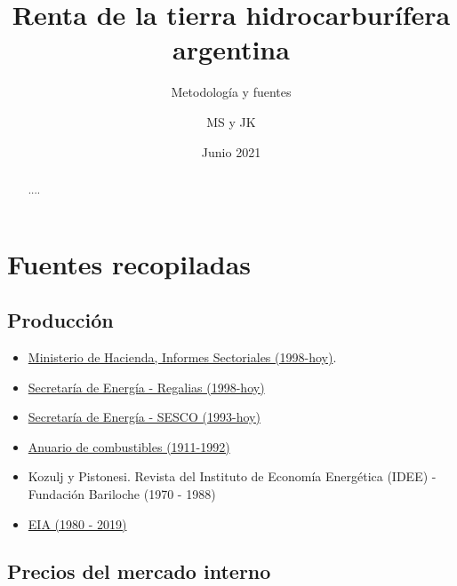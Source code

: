 \documentclass[letterpaper,11pt, spanish]{scrartcl}
\begin{document}
\title{Renta de la tierra hidrocarburífera argentina}
\subtitle{Metodología y fuentes}
\author{MS y JK}
\date{Junio 2021}
\maketitle

\begin{abstract}
....
\end{abstract}


\section{Fuentes recopiladas}
\subsection{Producción}

\begin{itemize}
    \item \hyperlink{https://www.argentina.gob.ar/economia/politicaeconomica/regionalysectorial/informesproductivos}{Ministerio de Hacienda, Informes Sectoriales (1998-hoy)}.
    \item \hyperlink{http://datos.minem.gob.ar/dataset/regalias-de-petroleo-crudo-gas-natural-glp-gasolina-y-condensado}{Secretaría de Energía - Regalias (1998-hoy)}
    \item \hyperlink{http://datos.minem.gob.ar/dataset/produccion-de-petroleo-y-gas-tablas-dinamicas}{Secretaría de Energía - SESCO (1993-hoy) }
    \item \hyperlink{http://datos.minem.gob.ar/dataset/anuarios-de-combustibles-1950-1999}{Anuario de combustibles (1911-1992)}
    \item Kozulj y Pistonesi. Revista  del Instituto de Economía Energética (IDEE) - Fundación Bariloche  (1970 - 1988)
    \item \hyperlink{https://www.eia.gov/international/data/country/ARG/petroleum-and-other-liquids/annual-petroleum-and-other-liquids-production?pd=5&p=0000000000000000000000000000000000vg&u=0&f=A&v=mapbubble&a=-&i=none&vo=value&&t=C&g=none&l=249--6&s=94694400000&e=1546300800000)}{EIA  (1980 - 2019)}
\end{itemize}

\subsection{Precios del mercado interno}
\end{document}
